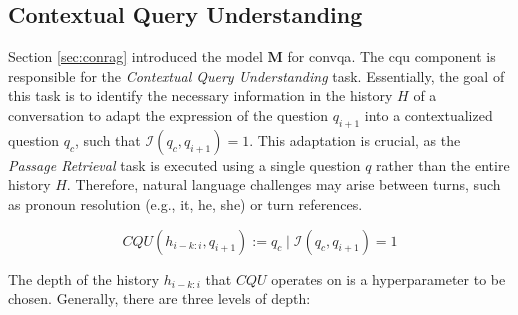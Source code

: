 







\subsection{Contextual Query Understanding}
\label{subsec:cqu}

Section \ref{sec:conrag} introduced the model $\mathbf{M}$ for \gls{convqa}. The \gls{cqu} component is responsible for the \textit{Contextual Query Understanding} task. Essentially, the goal of this task is to identify the necessary information in the history $H$ of a conversation to adapt the expression of the question $q_{i+1}$ into a contextualized question $q_c$, such that $\mathcal{I}(q_c, q_{i+1}) = 1$. This adaptation is crucial, as the \textit{Passage Retrieval} task is executed using a single question $q$ rather than the entire history $H$. Therefore, natural language challenges may arise between turns, such as pronoun resolution (e.g., it, he, she) or turn references.

\begin{equation}
    CQU(h_{i-k:i}, q_{i+1}) := q_c \mid \mathcal{I}(q_c, q_{i+1}) = 1
\end{equation}

The depth of the history $h_{i-k:i}$ that $CQU$ operates on is a hyperparameter to be chosen. Generally, there are three levels of depth:

